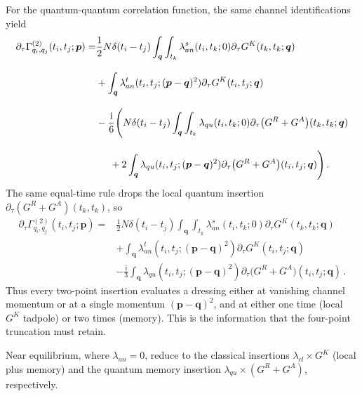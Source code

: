 \documentclass[reprint,english,superscriptaddress,preprintnumbers,amsmath,amssymb,aps,prd]{revtex4-1}
\begin{document}
For the quantum-quantum correlation function, the same channel identifications yield
\begin{align}
    \partial_{\tau}\Gamma_{q_i,q_j}^{(2)}(t_i,t_j;\boldsymbol{p})=&\frac{1}{2}N\delta(t_i-t_j)\int_{\boldsymbol{q}}\int_{t_k}\lambda_{an}^{s}(t_i,t_k;0)\partial_{\tau}G^{K}(t_k,t_k;\boldsymbol{q})\nonumber\\[2ex]
    &+\int_{\boldsymbol{q}}\lambda_{an}^{t}(t_i,t_j;(\boldsymbol{p}-\boldsymbol{q})^2)\partial_{\tau}G^{K}(t_i,t_j;\boldsymbol{q})\nonumber\\[2ex]
    &-\frac{\mathrm{i}}{6}\Bigg(N\delta(t_i-t_j)\int_{\boldsymbol{q}}\int_{t_k}\lambda_{qu}(t_i,t_k;0)\partial_{\tau}\big(G^{R}+G^{A}\big)(t_k,t_k;\boldsymbol{q})\nonumber\\[2ex]
    &\hspace{0.5cm}+2\int_{\boldsymbol{q}}\lambda_{qu}(t_i,t_j;(\boldsymbol{p}-\boldsymbol{q})^2)\partial_{\tau}\big(G^{R}+G^{A}\big)(t_i,t_j;\boldsymbol{q})\Bigg)\,.\label{eq:qq-final}
\end{align}
The same equal-time rule drops the local quantum insertion $\partial_{\tau}(G^{R}+G^{A})(t_k,t_k)$, so
\begin{align}
    \partial_{\tau}\Gamma_{q_i,q_j}^{(2)}(t_i,t_j;\boldsymbol{p})=&\frac{1}{2}N\delta(t_i-t_j)\int_{\boldsymbol{q}}\int_{t_k}\lambda_{an}^{s}(t_i,t_k;0)\partial_{\tau}G^{K}(t_k,t_k;\boldsymbol{q})\nonumber\\[2ex]
    &+\int_{\boldsymbol{q}}\lambda_{an}^{t}(t_i,t_j;(\boldsymbol{p}-\boldsymbol{q})^2)\partial_{\tau}G^{K}(t_i,t_j;\boldsymbol{q})\nonumber\\[2ex]
    &-\frac{\mathrm{i}}{3}\int_{\boldsymbol{q}}\lambda_{qu}(t_i,t_j;(\boldsymbol{p}-\boldsymbol{q})^2)\partial_{\tau}\big(G^{R}+G^{A}\big)(t_i,t_j;\boldsymbol{q})\,.\label{eq:qq-equaltime}
\end{align}
Thus every two-point insertion evaluates a dressing either at vanishing channel momentum or at a single momentum $(\boldsymbol{p}-\boldsymbol{q})^{2}$, and at either one time (local $G^{K}$ tadpole) or two times (memory). This is the information that the four-point truncation must retain.

Near equilibrium, where $\lambda_{an}=0$,  reduce to the classical insertions $\lambda_{cl}\times G^{K}$ (local plus memory) and the quantum memory insertion $\lambda_{qu}\times(G^{R}+G^{A})$, respectively.

\end{document}
